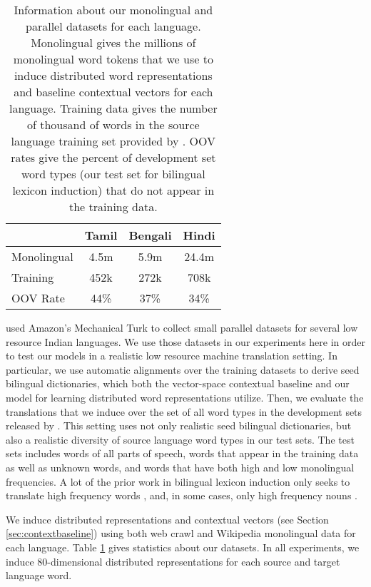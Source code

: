 \documentclass[11pt,letterpaper]{article}
\begin{document}
\begin{table}
\vspace{-.25cm}
\small
\begin{center}
\begin{tabular}{|l|c|c|c|}
\hline
{} & Tamil & Bengali & Hindi \\
\hline
Monolingual & 4.5m & 5.9m & 24.4m \\ %
Training & 452k & 272k & 708k \\
OOV Rate & 44\% & 37\% & 34\% \\
\hline
\end{tabular}
\end{center}
\caption{Information about our monolingual and parallel datasets for each language. Monolingual gives the millions of monolingual word tokens that we use to induce distributed word representations and baseline contextual vectors for each language. Training data gives the number of thousand of words in the source language training set provided by . OOV rates give the percent of development set word types (our test set for bilingual lexicon induction) that do not appear in the training data.}\label{datastats}
\vspace{-.35cm}
\end{table}


 used Amazon's Mechanical Turk to collect small parallel datasets for several low resource Indian languages. 
We use those datasets in our experiments here in order to test our models in a realistic low resource machine translation setting.
In particular, we use automatic alignments over the training datasets to derive seed bilingual dictionaries, which both the vector-space contextual baseline and our model for learning distributed word representations  utilize.
Then, we evaluate the translations that we induce over the set of all word types in the development sets released by .
This setting uses not only realistic seed bilingual dictionaries, but also a realistic diversity of source language word types in our test sets.
The test sets includes words of all parts of speech, words that appear in the training data as well as unknown words, and words that have both high and low monolingual frequencies.
A lot of the prior work in bilingual lexicon induction only seeks to translate high frequency words \cite{something}, and, in some cases, only high frequency nouns \cite{koehn02,haghighi08}.

We induce distributed representations and contextual vectors (see Section \ref{sec:contextbaseline}) using both web crawl and Wikipedia monolingual data for each language.
Table \ref{datastats} gives statistics about our datasets.
In all experiments, we induce 80-dimensional distributed representations for each source and target language word.
\end{document}
